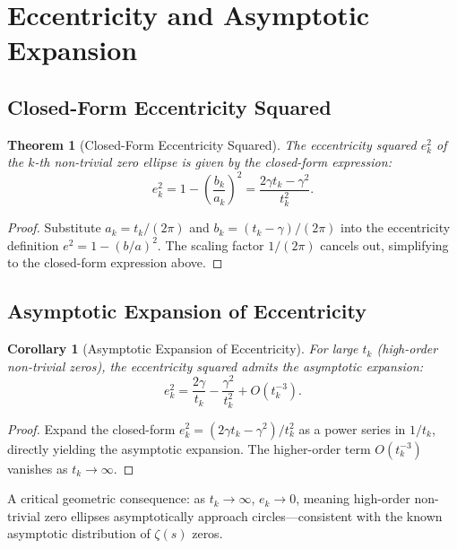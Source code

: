 \documentclass[12pt,a4paper]{article}
\newtheorem{theorem}{Theorem}
\newtheorem{corollary}{Corollary}
\theoremstyle{definition}
\begin{document}
\section{Eccentricity and Asymptotic Expansion}
\label{sec:eccentricity}

\subsection{Closed-Form Eccentricity Squared}
\begin{theorem}[Closed-Form Eccentricity Squared]
\label{thm:eccentricity}
The eccentricity squared $e_k^2$ of the $k$-th non-trivial zero ellipse is given by the closed-form expression:
\[
\boxed{e_k^2 = 1 - \left(\frac{b_k}{a_k}\right)^2 = \frac{2\gamma t_k - \gamma^2}{t_k^2}.}
\]
\end{theorem}

\begin{proof}
Substitute $a_k = t_k/(2\pi)$ and $b_k = (t_k - \gamma)/(2\pi)$ into the eccentricity definition $e^2 = 1 - (b/a)^2$. The scaling factor $1/(2\pi)$ cancels out, simplifying to the closed-form expression above.
\end{proof}

\subsection{Asymptotic Expansion of Eccentricity}
\begin{corollary}[Asymptotic Expansion of Eccentricity]
\label{cor:ecc_asymp}
For large $t_k$ (high-order non-trivial zeros), the eccentricity squared admits the asymptotic expansion:
\[
\boxed{e_k^2 = \frac{2\gamma}{t_k} - \frac{\gamma^2}{t_k^2} + O(t_k^{-3}).}
\]
\end{corollary}

\begin{proof}
Expand the closed-form $e_k^2 = (2\gamma t_k - \gamma^2)/t_k^2$ as a power series in $1/t_k$, directly yielding the asymptotic expansion. The higher-order term $O(t_k^{-3})$ vanishes as $t_k \to \infty$.
\end{proof}

A critical geometric consequence: as $t_k \to \infty$, $e_k \to 0$, meaning high-order non-trivial zero ellipses asymptotically approach circles---consistent with the known asymptotic distribution of $\zeta(s)$ zeros.

\end{document}
